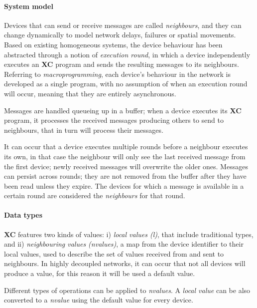 
\paragraph{System model}
Devices that can send or receive messages are called \emph{neighbours}, and they can change dynamically to model network
delays, failures or spatial movements.
Based on existing homogeneous systems, the device behaviour has been abstracted through a notion of \emph{execution round},
in which a device independently executes an \textbf{XC} program and sends the resulting messages to its neighbours.
Referring to \emph{macroprogramming}, each device's behaviour in the network is developed as a single program, with no
assumption of when an execution round will occur, meaning that they are entirely asynchronous.

Messages are handled queueing up in a buffer; when a device executes its \textbf{XC} program, it processes the received
messages producing others to send to neighbours, that in turn will process their messages.

It can occur that a device executes multiple rounds before a neighbour executes its own, in that case the neighbour will
only see the last received message from the first device; newly received messages will overwrite the older ones.
Messages can persist across rounds; they are not removed from the buffer after they have been read unless they expire.
The devices for which a message is available in a certain round are considered the \emph{neighbours} for that round.

\paragraph{Data types}
\textbf{XC} features two kinds of values:
    i) \emph{local values (l)}, that include traditional types, and
    ii) \emph{neighbouring values (nvalues)}, a map from the device identifier to their local values, used to describe
        the set of values received from and sent to neighbours.
In highly decoupled networks, it can occur that not all devices will produce a value, for this reason it will be used
a default value.

Different types of operations can be applied to \emph{nvalues}.
A \emph{local value} can be also converted to a \emph{nvalue} using the default value for every device.

